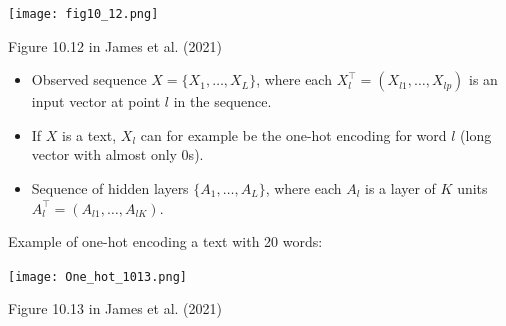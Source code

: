 \documentclass[
  10pt,
  ignorenonframetext,
]{beamer}
\providecommand{\tightlist}{%
  \setlength{\itemsep}{0pt}\setlength{\parskip}{0pt}}
\begin{document}
\begin{frame}
\centering

\texttt{[image: fig10\_12.png]}

\scriptsize Figure 10.12 in James et al. (2021)

\vspace{2mm}

\normalsize

\begin{itemize}
\tightlist
\item
  Observed sequence \(X=\{ X_1, \ldots , X_L \}\), where each
  \(X_l^\top=(X_{l1},\ldots, X_{lp})\) is an input vector at point \(l\)
  in the sequence.
\end{itemize}

\vspace{2mm}

\begin{itemize}
\tightlist
\item
  If \(X\) is a text, \(X_l\) can for example be the one-hot encoding
  for word \(l\) (long vector with almost only 0s).
\end{itemize}

\vspace{2mm}

\begin{itemize}
\tightlist
\item
  Sequence of hidden layers \(\{ A_1, \ldots, A_L \}\), where each
  \(A_l\) is a layer of \(K\) units
  \(A_l^\top = (A_{l1}, \ldots , A_{lK})\).
\end{itemize}
\end{frame}

\begin{frame}
Example of one-hot encoding a text with 20 words:

\texttt{[image: One\_hot\_1013.png]}

\scriptsize

Figure 10.13 in James et al. (2021)
\end{frame}
\end{document}
